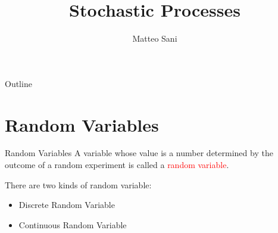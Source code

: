 \documentclass{beamer}
\title{Stochastic Processes}
\author{Matteo Sani}
\begin{document}
\begin{frame}[plain]
    \maketitle
\end{frame}



\begin{frame}{Outline}
	\tableofcontents
\end{frame}

\section{Random Variables}
\begin{frame}{Random Variables}
A variable whose value is a number determined by the outcome of a random experiment is called a \textcolor{red}{random variable}.
\newline

There are two kinds of random variable:
\begin{itemize}
	\item Discrete Random Variable
	\item Continuous Random Variable
\end{itemize}
\end{frame}
\end{document}
